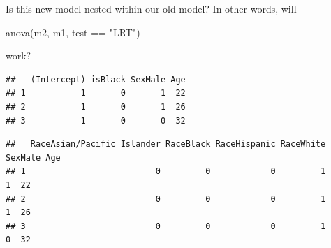 \documentclass[
  ignorenonframetext,
]{beamer}
\newenvironment{Shaded}{\begin{snugshade}}{\end{snugshade}}
\newcommand{\DecValTok}[1]{\textcolor[rgb]{0.00,0.00,0.81}{#1}}
\newcommand{\FunctionTok}[1]{\textcolor[rgb]{0.00,0.00,0.00}{#1}}
\newcommand{\NormalTok}[1]{#1}
\newcommand{\OtherTok}[1]{\textcolor[rgb]{0.56,0.35,0.01}{#1}}
\newcommand{\SpecialCharTok}[1]{\textcolor[rgb]{0.00,0.00,0.00}{#1}}
\newcommand{\StringTok}[1]{\textcolor[rgb]{0.31,0.60,0.02}{#1}}
\begin{document}
\begin{frame}[fragile]{}
\protect\hypertarget{section-12}{}
Is this new model nested within our old model? In other words, will

\begin{Shaded}
\begin{Highlighting}[]
\FunctionTok{anova}\NormalTok{(m2, m1, test }\SpecialCharTok{==} \StringTok{"LRT"}\NormalTok{)}
\end{Highlighting}
\end{Shaded}

work?

\vspace{12pt}
\tiny

\begin{Shaded}
\end{Shaded}

\begin{verbatim}
##   (Intercept) isBlack SexMale Age
## 1           1       0       1  22
## 2           1       0       1  26
## 3           1       0       0  32
\end{verbatim}

\begin{Shaded}
\end{Shaded}

\begin{verbatim}
##   RaceAsian/Pacific Islander RaceBlack RaceHispanic RaceWhite SexMale Age
## 1                          0         0            0         1       1  22
## 2                          0         0            0         1       1  26
## 3                          0         0            0         1       0  32
\end{verbatim}

\begin{Shaded}
\end{Shaded}


\end{frame}
\end{document}
